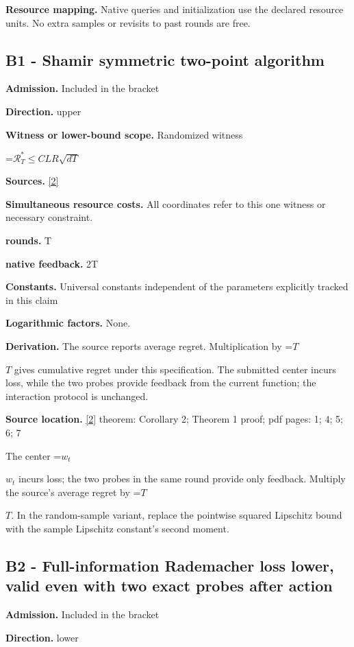 \documentclass[10pt,a4paper]{article}
\newcommand{\AtlasMath}[1]{\par\begingroup\centering\setbox0=\hbox{$\displaystyle #1$}\ifdim\wd0>1.4\linewidth\typeout{ATLAS WIDE FORMULA: \the\wd0}\fi\ifdim\wd0>\linewidth\resizebox{\linewidth}{!}{\box0}\else\box0\fi\par\endgroup}
\newcommand{\AtlasInlineMath}[1]{\begingroup\setbox0=\hbox{$#1$}\ifdim\wd0>.4\linewidth\endgroup\AtlasMath{#1}\else\endgroup$#1$\fi}
\begin{document}
\textbf{Resource mapping.} Native queries and initialization use the declared resource units. No extra samples or revisits to past rounds are free.

\subsection{B1 - Shamir symmetric two-point algorithm}
\textbf{Admission.} Included in the bracket

\textbf{Direction.} upper

\textbf{Witness or lower-bound scope.} Randomized witness

\AtlasMath{\mathcal{R}_T^*\le C L R\sqrt{dT}}
\textbf{Sources.} \href{https://jmlr.org/papers/volume18/16-632/16-632.pdf}{[2]}

\textbf{Simultaneous resource costs.} All coordinates refer to this one witness or necessary constraint.

\textbf{rounds.} T

\textbf{native feedback.} 2T

\textbf{Constants.} Universal constants independent of the parameters explicitly tracked in this claim

\textbf{Logarithmic factors.} None.

\textbf{Derivation.} The source reports average regret. Multiplication by \AtlasInlineMath{T} gives cumulative regret under this specification. The submitted center incurs loss, while the two probes provide feedback from the current function; the interaction protocol is unchanged.

\textbf{Source location.} \href{https://jmlr.org/papers/volume18/16-632/16-632.pdf}{[2]} theorem: Corollary 2; Theorem 1 proof; pdf pages: 1; 4; 5; 6; 7

The center \AtlasInlineMath{w_t} incurs loss; the two probes in the same round provide only feedback. Multiply the source's average regret by \AtlasInlineMath{T}. In the random-sample variant, replace the pointwise squared Lipschitz bound with the sample Lipschitz constant's second moment.

\subsection{B2 - Full-information Rademacher loss lower, valid even with two exact probes after action}
\textbf{Admission.} Included in the bracket

\textbf{Direction.} lower
\end{document}
